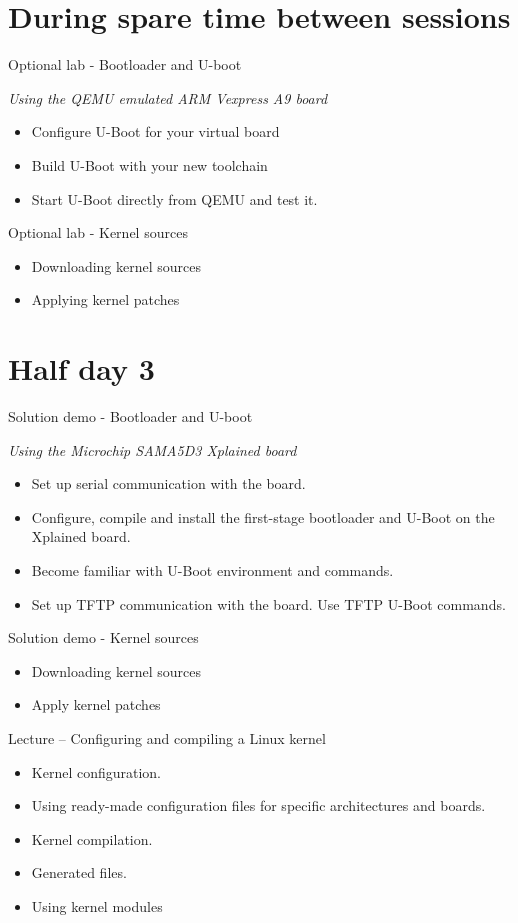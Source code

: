 \documentclass[a4paper,12pt,obeyspaces,spaces,hyphens]{article}
\begin{document}
\section{During spare time between sessions}

\feagendaonecolumn
{Optional lab - Bootloader and U-boot}
{
  {\em Using the QEMU emulated ARM Vexpress A9 board}
  \begin{itemize}
  \item Configure U-Boot for your virtual board
  \item Build U-Boot with your new toolchain
  \item Start U-Boot directly from QEMU and test it.
  \end{itemize}
}

\feagendaonecolumn
{Optional lab - Kernel sources}
{
  \begin{itemize}
  \item Downloading kernel sources
  \item Applying kernel patches
  \end{itemize}
}

\section{Half day 3}

\feagendaonecolumn
{Solution demo - Bootloader and U-boot}
{
  {\em Using the Microchip SAMA5D3 Xplained board}
  \begin{itemize}
  \item Set up serial communication with the board.
  \item Configure, compile and install the first-stage bootloader
        and U-Boot on the Xplained board.
  \item Become familiar with U-Boot environment and commands.
  \item Set up TFTP communication with the board. Use TFTP U-Boot commands.
  \end{itemize}
}

\feagendaonecolumn
{Solution demo - Kernel sources}
{
  \begin{itemize}
  \item Downloading kernel sources
  \item Apply kernel patches
  \end{itemize}
}

\feagendaonecolumn
{Lecture – Configuring and compiling a Linux kernel}
{
  \begin{itemize}
  \item Kernel configuration.
  \item Using ready-made configuration files for specific
    architectures and boards.
  \item Kernel compilation.
  \item Generated files.
  \item Using kernel modules
  \end{itemize}
}
\end{document}
